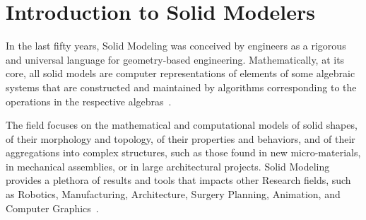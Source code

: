 %
%
%
%
%

\chapter{Introduction to Solid Modelers}
\label{chapt:intro}

In the last fifty years, Solid Modeling was conceived by engineers as a rigorous and universal language for geometry-based engineering.   Mathematically, at its core,  all solid models are computer representations of elements of some algebraic systems that are constructed and maintained by algorithms corresponding to the operations in the respective algebras~\cite{PAOLUZZI2023103436}.

The field focuses on the mathematical and computational models of solid shapes, of their morphology and topology, of their properties and behaviors, and of their aggregations into complex structures, such as those found in new micro-materials, in mechanical assemblies, or in large architectural projects. Solid Modeling provides a plethora of results and tools that impacts other Research fields, such as Robotics, Manufacturing, Architecture, Surgery Planning, Animation, and Computer Graphics~\cite{Rossignac:22:personal}.



